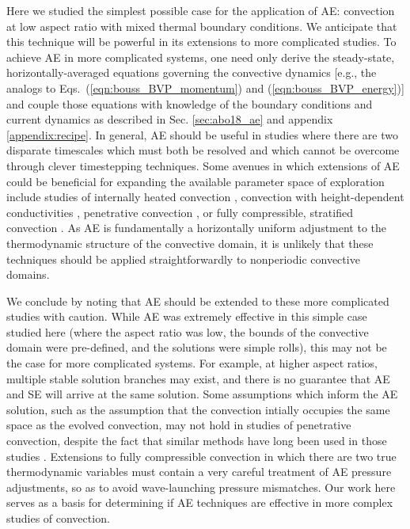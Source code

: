 Here we studied the simplest possible case for the application of AE: \RB convection at low aspect ratio with mixed thermal boundary conditions. 
We anticipate that this technique will be powerful in its extensions to more complicated studies.
To achieve AE in more complicated systems, one need only derive the steady-state, horizontally-averaged equations governing the convective dynamics [e.g., the analogs to Eqs.~(\ref{eqn:bouss_BVP_momentum}) and (\ref{eqn:bouss_BVP_energy})] and couple those equations with knowledge of the boundary conditions and current dynamics as described in Sec. \ref{sec:abo18_ae} and appendix \ref{appendix:recipe}.
In general, AE should be useful in studies where there are two disparate timescales which must both be resolved and which cannot be overcome through clever timestepping techniques.  
Some avenues in which extensions of AE could be beneficial for expanding the available parameter space of exploration include studies of internally heated convection \cite{goluskin2016}, convection with height-dependent conductivities \cite{kapyla&all2017}, penetrative convection \cite{hurlburt&all1986,brandenburg&all2005,couston&all2017}, or fully compressible, stratified convection \cite{anders&brown2017}.
As AE is fundamentally a horizontally uniform adjustment to the thermodynamic structure of the convective domain, it is unlikely that these techniques should be applied straightforwardly to nonperiodic convective domains.

We conclude by noting that AE should be extended to these more complicated studies with caution. 
While AE was extremely effective in this simple case studied here (where the aspect ratio was low,  the bounds of the convective domain were pre-defined, and the solutions were simple rolls), this may not be the case for more complicated systems. 
For example, at higher aspect ratios, multiple stable solution branches may exist, and there is no guarantee that AE and SE will arrive at the same solution. 
Some assumptions which inform the AE solution, such as the assumption that the convection intially occupies the same space as the evolved convection, may not hold in studies of penetrative convection, despite the fact that similar methods have long been used in those studies \cite{hurlburt&all1986}. 
Extensions to fully compressible convection in which there are two true thermodynamic variables \cite{anders&brown2017} must contain a very careful treatment of AE pressure adjustments, so as to avoid wave-launching pressure mismatches.
Our work here serves as a basis for determining if AE techniques are effective in more complex studies of convection.


